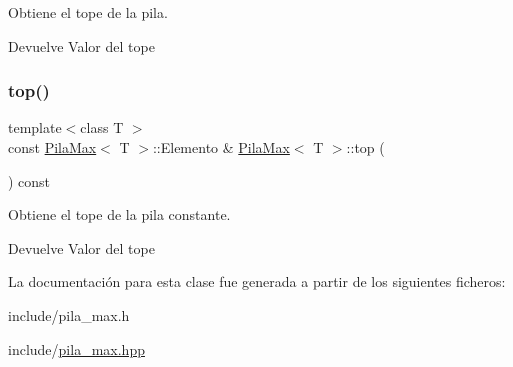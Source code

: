 Obtiene el tope de la pila. 

\begin{DoxyReturn}{Devuelve}
Valor del tope 
\end{DoxyReturn}
\mbox{\label{classPilaMax_a73ea1d2e5b631b551613b2b3e2d884f3}} 
\subsubsection{\texorpdfstring{top()}{top()}\hspace{0.1cm}{\footnotesize\ttfamily [2/2]}}
{\footnotesize\ttfamily template$<$class T $>$ \\
const \hyperlink{classPilaMax}{Pila\+Max}$<$ T $>$\+::Elemento \& \hyperlink{classPilaMax}{Pila\+Max}$<$ T $>$\+::top (\begin{DoxyParamCaption}{ }\end{DoxyParamCaption}) const}



Obtiene el tope de la pila constante. 

\begin{DoxyReturn}{Devuelve}
Valor del tope 
\end{DoxyReturn}


La documentación para esta clase fue generada a partir de los siguientes ficheros\+:\begin{DoxyCompactItemize}
\item 
include/pila\+\_\+max.\+h\item 
include/\hyperlink{pila__max_8hpp}{pila\+\_\+max.\+hpp}\end{DoxyCompactItemize}
